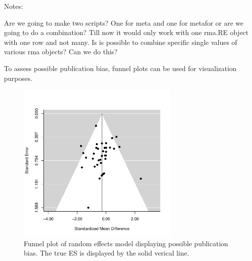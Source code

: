 \documentclass[11pt, a4paper]{article} %
\begin{document}
Notes:

Are we going to make two scripts? One for meta and one for metafor or are we going to do a combination? 
Till now it would only work with one rma.RE object with one row and not many. Is is possible to combine specific single values of various rma objects? Can we do this?



To assess possible publication bias, funnel plots can be used for visualization purposes.


\begin{figure}
\captionsetup{width=0.6\textwidth}
\centering
\includegraphics[width=0.7\textwidth]{sweave_document_TB-funnelplot}
\caption{Funnel plot of random effects model displaying possible publication bias. The true ES is displayed by the solid verical line.}
\end{figure}
\end{document}

